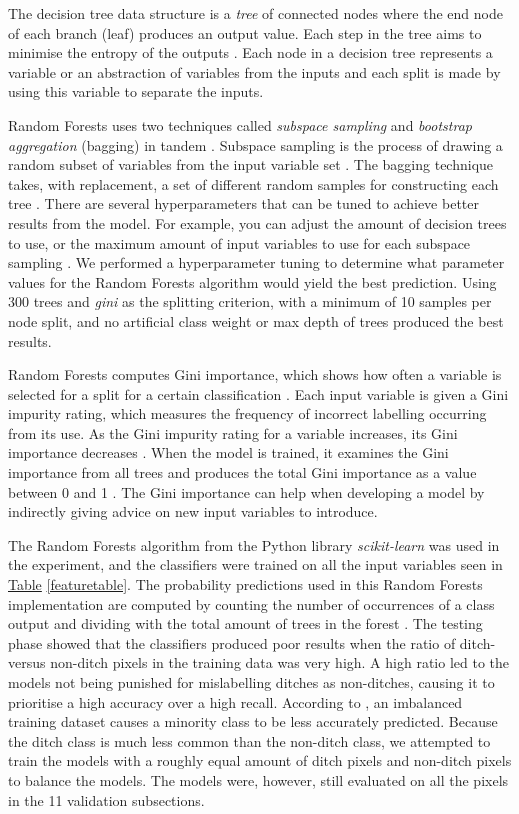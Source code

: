 \documentclass[]{interact}
\theoremstyle{plain}%
\theoremstyle{definition}
\theoremstyle{remark}
\begin{document}
The decision tree data structure is a \textit{tree} of connected nodes where the end node of each branch (leaf) produces an output value. Each step in the tree aims to minimise the entropy of the outputs \citep{kotsiantis}. Each node in a decision tree represents a variable or an abstraction of variables from the inputs and each split is made by using this variable to separate the inputs.

Random Forests uses two techniques called \textit{subspace sampling} and \textit{bootstrap aggregation} (bagging) in tandem \citep{breiman}. Subspace sampling is the process of drawing a random subset of variables from the input variable set \citet{ho}. The bagging technique takes, with replacement, a set of different random samples for constructing each tree \citep{flach}. There are several hyperparameters that can be tuned to achieve better results from the model. For example, you can adjust the amount of decision trees to use, or the maximum amount of input variables to use for each subspace sampling \citep{scikit-learn}. We performed a hyperparameter tuning to determine what parameter values for the Random Forests algorithm would yield the best prediction. Using 300 trees and \textit{gini} as the splitting criterion, with a minimum of 10 samples per node split, and no artificial class weight or max depth of trees produced the best results.

Random Forests computes Gini importance, which shows how often a variable is selected for a split for a certain classification \citep{gini}. Each input variable is given a Gini impurity rating, which measures the frequency of incorrect labelling occurring from its use. As the Gini impurity rating for a variable increases, its Gini importance decreases \citep{gini}. When the model is trained, it examines the Gini importance from all trees and produces the total Gini importance as a value between 0 and 1 \citep{gini}. The Gini importance can help when developing a model by indirectly giving advice on new input variables to introduce.

The Random Forests algorithm from the Python library \textit{scikit-learn} was used in the experiment, and the classifiers were trained on all the input variables seen in \hyperref[featuretable]{Table} \ref{featuretable}. The probability predictions used in this Random Forests implementation are computed by counting the number of occurrences of a class output and dividing with the total amount of trees in the forest \citep{scikit-learn}. The testing phase showed that the classifiers produced poor results when the ratio of ditch- versus non-ditch pixels in the training data was very high. A high ratio led to the models not being punished for mislabelling ditches as non-ditches, causing it to prioritise a high accuracy over a high recall. According to \citet{balanced}, an imbalanced training dataset causes a minority class to be less accurately predicted. Because the ditch class is much less common than the non-ditch class, we attempted to train the models with a roughly equal amount of ditch pixels and non-ditch pixels to balance the models. The models were, however, still evaluated on all the pixels in the 11 validation subsections.
\end{document}
